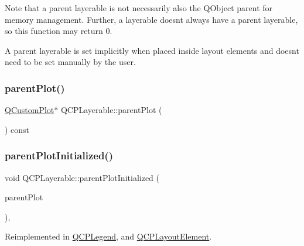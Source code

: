 Note that a parent layerable is not necessarily also the Q\+Object parent for memory management. Further, a layerable doesn\textquotesingle{}t always have a parent layerable, so this function may return 0.

A parent layerable is set implicitly when placed inside layout elements and doesn\textquotesingle{}t need to be set manually by the user. \mbox{\label{class_q_c_p_layerable_a473edb813a4c1929d6b6a8fe3ff3faf7}} 
\subsubsection{\texorpdfstring{parent\+Plot()}{parentPlot()}}
{\footnotesize\ttfamily \hyperlink{class_q_custom_plot}{Q\+Custom\+Plot}$\ast$ Q\+C\+P\+Layerable\+::parent\+Plot (\begin{DoxyParamCaption}{ }\end{DoxyParamCaption}) const\hspace{0.3cm}{\ttfamily [inline]}}

\mbox{\label{class_q_c_p_layerable_ab20b7dbd8e0249ed61adb9622c427382}} 
\subsubsection{\texorpdfstring{parent\+Plot\+Initialized()}{parentPlotInitialized()}}
{\footnotesize\ttfamily void Q\+C\+P\+Layerable\+::parent\+Plot\+Initialized (\begin{DoxyParamCaption}\item[{\hyperlink{class_q_custom_plot}{Q\+Custom\+Plot} $\ast$}]{parent\+Plot }\end{DoxyParamCaption})\hspace{0.3cm}{\ttfamily [protected]}, {\ttfamily [virtual]}}



Reimplemented in \hyperlink{class_q_c_p_legend_a2b225cefb5eb267771e2c7c44fd2b408}{Q\+C\+P\+Legend}, and \hyperlink{class_q_c_p_layout_element_ab4bb5c5a958451f5f153fdce350f13cf}{Q\+C\+P\+Layout\+Element}.

